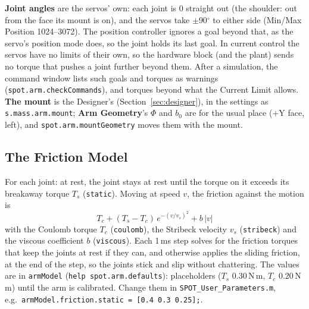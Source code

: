 \documentclass[11pt,a4paper]{article}
\newcommand{\ui}[1]{\textsf{\textbf{#1}}}
\newcommand{\pth}[1]{\texttt{#1}}
\newcommand{\fn}[1]{\texttt{#1}}
\begin{document}
\textbf{Joint angles} are the servos' own: each joint is 0 straight out (the shoulder: out from the face its mount is
on), and the servos take $\pm$90$^\circ$ to either side (Min/Max Position 1024--3072). The position controller ignores
a goal beyond that, as the servo's position mode does, so the joint holds its last goal. In current control the servos
have no limits of their own, so the hardware block (and the plant) sends no torque that pushes a joint further beyond
them. After a simulation, the command window lists such goals and torques as warnings (\fn{spot.arm.checkCommands}),
and torques beyond what the Current Limit allows. \textbf{The mount} is the Designer's (Section~\ref{sec:designer}), in
the settings as \fn{s.mass.arm.mount}; \ui{Arm Geometry}'s $\Phi$ and $b_0$ are for the usual place (+Y face, left), and
\fn{spot.arm.mountGeometry} moves them with the mount.

\subsection{The Friction Model}
For each joint: at rest, the joint stays at rest until the torque on it exceeds its breakaway torque $T_s$
(\fn{static}). Moving at speed $v$, the friction against the motion is
\[ T_c + (T_s - T_c)\,e^{-(v/v_s)^2} + b\,|v| \]
with the Coulomb torque $T_c$ (\fn{coulomb}), the Stribeck velocity $v_s$ (\fn{stribeck}) and the viscous coefficient
$b$ (\fn{viscous}). Each 1\,ms step solves for the friction torques that keep the joints at rest if they can, and
otherwise applies the sliding friction, at the end of the step, so the joints stick and slip without chattering.
The values are in \fn{armModel} (\fn{help spot.arm.defaults}): placeholders ($T_s$ 0.30\,N\,m, $T_c$ 0.20\,N\,m) until
the arm is calibrated. Change them in \pth{SPOT\_User\_Parameters.m}, e.g.\ \fn{armModel.friction.static = [0.4 0.3 0.25];}.
\end{document}
